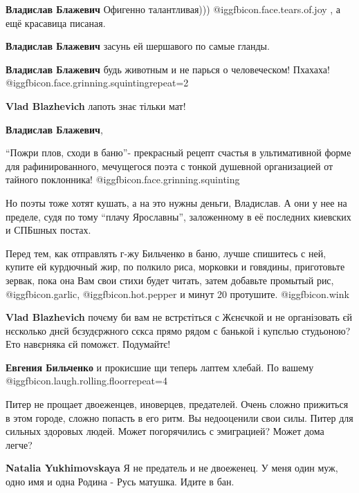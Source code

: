 \begin{itemize}
\begin{itemize}
\textbf{Владислав Блажевич} Офигенно талантливая)))  @igg{fbicon.face.tears.of.joy} , а ещё красавица писаная.

\textbf{Владислав Блажевич} засунь ей шершавого по самые гланды.

\textbf{Владислав Блажевич} будь животным и не парься о человеческом!
Пхахаха! @igg{fbicon.face.grinning.squinting}{repeat=2} 

\textbf{Vlad Blazhevich} лапоть знає тільки мат!

\textbf{Владислав Блажевич}, 

\enquote{Пожри плов, сходи в баню}- прекрасный рецепт счастья в ультимативной форме для
рафинированного, мечущегося поэта с тонкой душевной организацией от тайного
поклонника!  @igg{fbicon.face.grinning.squinting} 

Но поэты тоже хотят кушать, а на это нужны деньги, Владислав. А они у нее на
пределе, судя по тому \enquote{плачу Ярославны}, заложенному в её последних киевских и
СПБшных постах.

Перед тем, как отправлять г-жу Бильченко в баню, лучше спишитесь с ней, купите
ей курдючный жир, по полкило риса, морковки и говядины, приготовьте зервак,
пока она Вам свои стихи будет читать, затем добавьте промытый рис,
@igg{fbicon.garlic}, @igg{fbicon.hot.pepper} и
минут 20 протушите.  @igg{fbicon.wink} 

\textbf{Vlad Blazhevich} почєму би вам не встрєтіться с Жєнєчкой и не організовать єй нєсколько днєй бєзудєржного сєкса прямо рядом с банькой і купєлью студьоною? Ето навєрняка єй поможєт. Подумайтє!

\textbf{Евгения Бильченко} и прокисшие щи теперь лаптем хлебай. По вашему @igg{fbicon.laugh.rolling.floor}{repeat=4} 

\end{itemize} %


Питер не прощает двоеженцев, иноверцев, предателей. Очень сложно прижиться в
этом городе, сложно попасть в его ритм. Вы недооценили свои силы. Питер для
сильных здоровых людей. Может погорячились с эмиграцией? Может дома легче?

\begin{itemize} %
\textbf{Natalia Yukhimovskaya} Я не предатель и не двоеженец. У меня один муж, одно имя и одна Родина - Русь матушка. Идите в бан.


\end{itemize}
\end{itemize}
